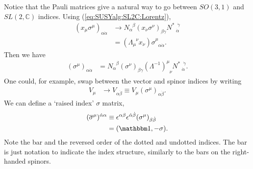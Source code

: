 Notice that the Pauli matrices give a natural way to go between $SO(3,1)$ and $SL(2,\mathbb C)$ indices. Using  (\ref{eq:SUSYalg:SL2C:Lorentz}),
\begin{align}
    (x_\mu\sigma^\mu)_{\alpha\dot\alpha} &\rightarrow N_\alpha^{\phantom\alpha\beta}(x_\nu\sigma^\nu)_{\beta\dot\gamma}N^{*\phantom{\dot\alpha}\dot\gamma}_{\phantom *\dot\alpha}\\
    &= (\Lambda_\mu^{\phantom\mu\nu}x_\nu)\sigma^\mu_{\phantom\mu\alpha\dot\alpha}.
\end{align}
Then we have
\begin{align}
    (\sigma^\mu)_{\alpha\dot\alpha} &= N_\alpha^{\phantom\alpha\beta}(\sigma^\nu)_{\beta\dot\gamma}(\Lambda^{-1})^\mu_{\phantom\mu\nu}N^{*\phantom{\dot\alpha}\dot\gamma}_{\phantom*\dot\alpha}.
\end{align}
One could, for example, swap between the vector and spinor indices by writing
\begin{align}
    V_\mu & \rightarrow V_{\alpha\dot\beta} \equiv V_\mu (\sigma^\mu)_{\alpha\dot\beta}.\label{eq:SUSYalg:vecspinor}
\end{align} 
We can define a `raised index' $\sigma$ matrix,
\begin{align}
    (\overline\sigma^\mu)^{\dot\alpha\alpha} &\equiv \epsilon^{\alpha\beta}\epsilon^{\dot\alpha\dot\beta}(\sigma^\mu)_{\beta\dot\beta}\label{eq:SUSYalg:sigmamu}\\
    &= (\mathbbm 1, -{\mathbf{\sigma}}).\label{eq:SUSYalg:sigma-bar}
\end{align}
Note the bar and the reversed order of the dotted and undotted indices. The bar is just notation to indicate the index structure, similarly to the bars on the right-handed spinors. 

